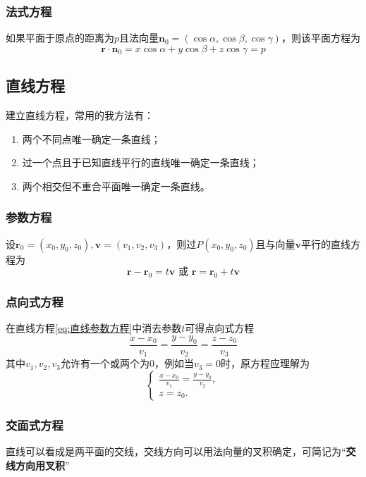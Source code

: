\subsubsection{法式方程}
如果平面于原点的距离为$p$且法向量$\bm{n}_0=(\cos\alpha,\cos\beta,\cos\gamma)$，则该平面方程为
\begin{equation}
    \label{eq:平面法式方程}
    \bm{r}\cdot\bm{n}_0 = x\cos\alpha + y\cos\beta + z\cos\gamma = p
\end{equation}

\subsection{直线方程}
建立直线方程，常用的我方法有：
\begin{enumerate}[(1)]
    \item 两个不同点唯一确定一条直线；
    \item 过一个点且于已知直线平行的直线唯一确定一条直线；
    \item 两个相交但不重合平面唯一确定一条直线。
\end{enumerate}

\subsubsection{参数方程}
设$\bm{r}_0=(x_0,y_0,z_0),\bm{v}=(v_1,v_2,v_3)$，则过$P(x_0,y_0,z_0)$且与向量$\bm{v}$平行的直线方程为
\begin{equation}
    \label{eq:直线参数方程}
    \bm{r}-\bm{r}_0 = t\bm{v}\text{ 或~} \bm{r} = \bm{r}_0 + t\bm{v}
\end{equation}

\subsubsection{点向式方程}
在直线方程\ref{eq:直线参数方程}中消去参数$t$可得点向式方程
\begin{equation}
    \label{eq:直线点向式方程}
    \frac{x-x_0}{v_1} = \frac{y-y_0}{v_2} = \frac{z-z_0}{v_3}
\end{equation}
其中$v_1,v_2,v_3$允许有一个或两个为$0$，例如当$v_3=0$时，原方程应理解为
\[
    \begin{cases}
        \frac{x-x_0}{v_1} = \frac{y-y_0}{v_2}, \\
        z=z_0.
    \end{cases}
\]

\subsubsection{交面式方程}
直线可以看成是两平面的交线，交线方向可以用法向量的叉积确定，可简记为“\textbf{\textsf{交线方向用叉积}}”

